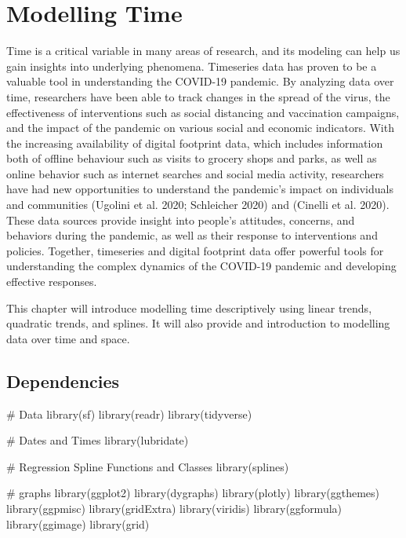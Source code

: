 \documentclass[
  letterpaper,
  DIV=11,
  numbers=noendperiod]{scrreprt}
\newenvironment{Shaded}{\begin{snugshade}}{\end{snugshade}}
\newcommand{\CommentTok}[1]{\textcolor[rgb]{0.37,0.37,0.37}{#1}}
\newcommand{\FunctionTok}[1]{\textcolor[rgb]{0.28,0.35,0.67}{#1}}
\newcommand{\NormalTok}[1]{\textcolor[rgb]{0.00,0.23,0.31}{#1}}
\begin{document}

\hypertarget{sec-chp8}{%
\chapter{Modelling Time}\label{sec-chp8}}

Time is a critical variable in many areas of research, and its modeling
can help us gain insights into underlying phenomena. Timeseries data has
proven to be a valuable tool in understanding the COVID-19 pandemic. By
analyzing data over time, researchers have been able to track changes in
the spread of the virus, the effectiveness of interventions such as
social distancing and vaccination campaigns, and the impact of the
pandemic on various social and economic indicators. With the increasing
availability of digital footprint data, which includes information both
of offline behaviour such as visits to grocery shops and parks, as well
as online behavior such as internet searches and social media activity,
researchers have had new opportunities to understand the pandemic's
impact on individuals and communities (Ugolini et al. 2020; Schleicher
2020) and (Cinelli et al. 2020). These data sources provide insight into
people's attitudes, concerns, and behaviors during the pandemic, as well
as their response to interventions and policies. Together, timeseries
and digital footprint data offer powerful tools for understanding the
complex dynamics of the COVID-19 pandemic and developing effective
responses.

This chapter will introduce modelling time descriptively using linear
trends, quadratic trends, and splines. It will also provide and
introduction to modelling data over time and space.

\hypertarget{dependencies-3}{%
\section{Dependencies}\label{dependencies-3}}

\begin{Shaded}
\begin{Highlighting}[]
\CommentTok{\# Data}
\FunctionTok{library}\NormalTok{(sf)}
\FunctionTok{library}\NormalTok{(readr)}
\FunctionTok{library}\NormalTok{(tidyverse)}

\CommentTok{\# Dates and Times}
\FunctionTok{library}\NormalTok{(lubridate)}

\CommentTok{\# Regression Spline Functions and Classes}
\FunctionTok{library}\NormalTok{(splines)}

\CommentTok{\# graphs}
\FunctionTok{library}\NormalTok{(ggplot2)}
\FunctionTok{library}\NormalTok{(dygraphs)}
\FunctionTok{library}\NormalTok{(plotly)}
\FunctionTok{library}\NormalTok{(ggthemes)}
\FunctionTok{library}\NormalTok{(ggpmisc)}
\FunctionTok{library}\NormalTok{(gridExtra)}
\FunctionTok{library}\NormalTok{(viridis)}
\FunctionTok{library}\NormalTok{(ggformula)}
\FunctionTok{library}\NormalTok{(ggimage)}
\FunctionTok{library}\NormalTok{(grid)}
\end{Highlighting}
\end{Shaded}
\end{document}
